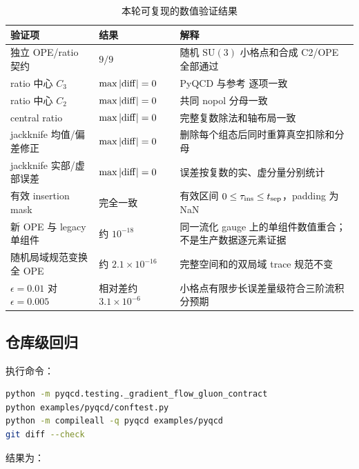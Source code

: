 \documentclass[UTF8,a4paper,11pt]{ctexart}
\newcommand{\code}[1]{\texttt{\detokenize{#1}}}
\newcommand{\SU}{\mathrm{SU}}
\begin{document}
\begin{table}[htbp]
\centering
\caption{本轮可复现的数值验证结果}
\begin{tabularx}{\textwidth}{@{}p{}p{}X@{}}
\toprule
验证项 & 结果 & 解释 \\
\midrule
独立 OPE/ratio 契约 &
$9/9$ &
随机 $\SU(3)$ 小格点和合成 C2/OPE 全部通过 \\
\midrule
ratio 中心 $C_3$ &
$\max|{\rm diff}|=0$ &
PyQCD 与参考 \code{calc\_ratio\_gradient\_flow.py} 逐项一致 \\
\midrule
ratio 中心 $C_2$ &
$\max|{\rm diff}|=0$ &
共同 nopol 分母一致 \\
\midrule
central ratio &
$\max|{\rm diff}|=0$ &
完整复数除法和轴布局一致 \\
\midrule
jackknife 均值/偏差修正 &
$\max|{\rm diff}|=0$ &
删除每个组态后同时重算真空扣除和分母 \\
\midrule
jackknife 实部/虚部误差 &
$\max|{\rm diff}|=0$ &
误差按复数的实、虚分量分别统计 \\
\midrule
有效 insertion mask &
完全一致 &
有效区间 $0\leq\tau_{\rm ins}\leq t_{\rm sep}$，padding 为 NaN \\
\midrule
新 OPE 与 legacy 单组件 &
约 $10^{-18}$ &
同一流化 gauge 上的单组件数值重合；不是生产数据逐元素证据 \\
\midrule
随机局域规范变换全 OPE &
约 $2.1\times10^{-16}$ &
完整空间和的双局域 trace 规范不变 \\
\midrule
$\epsilon=0.01$ 对 $\epsilon=0.005$ &
相对差约 $3.1\times10^{-6}$ &
小格点有限步长误差量级符合三阶流积分预期 \\
\bottomrule
\end{tabularx}
\end{table}

\subsection{仓库级回归}

执行命令：
\begin{lstlisting}[language=bash]
python -m pyqcd.testing._gradient_flow_gluon_contract
python examples/pyqcd/conftest.py
python -m compileall -q pyqcd examples/pyqcd
git diff --check
\end{lstlisting}

结果为：
\begin{center}
\end{center}
\end{document}
